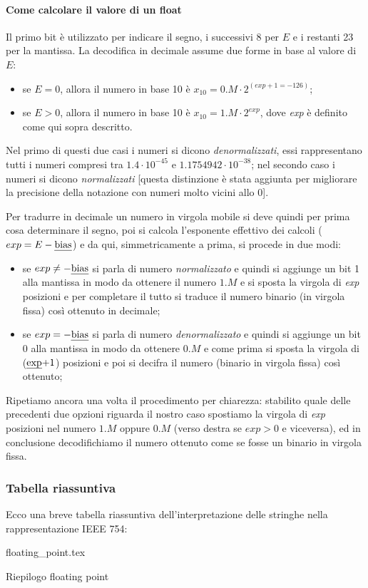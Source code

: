 \documentclass[class=book, crop=false, oneside]{standalone}
\begin{document}
\paragraph{Come calcolare il valore di un float} Il primo bit è utilizzato per indicare il segno, i successivi 8 per \(E\) e i restanti 23 per la mantissa. La decodifica in decimale assume due forme in base al valore di \(E\):
\begin{itemize}
	\item se \(E=0\), allora il numero in base 10 è \(x_{10}=0.M \cdot 2^{(exp+1=-126)}\);
	\item se \(E>0\), allora il numero in base 10 è \(x_{10}=1.M \cdot 2^{exp}\), dove \emph{exp} è definito come qui sopra descritto.
\end{itemize}
Nel primo di questi due casi i numeri si dicono \emph{denormalizzati}, essi rappresentano tutti i numeri compresi tra \(1.4\cdot10^{-45}\) e \(1.1754942\cdot10^{-38}\); nel secondo caso i numeri si dicono \emph{normalizzati} [questa distinzione è stata aggiunta per migliorare la precisione della notazione con numeri molto vicini allo 0].

Per tradurre in decimale un numero in virgola mobile si deve quindi per prima cosa determinare il segno, poi si calcola l'esponente effettivo dei calcoli (\(exp=E-\text{\emph{bias}}\)) e da qui, simmetricamente a prima, si procede in due modi:
\begin{itemize}
	\item se \(exp\neq-\text{\emph{bias}}\) si parla di numero \emph{normalizzato} e quindi si aggiunge un bit 1 alla mantissa in modo da ottenere il numero \(1.M\) e si sposta la virgola di \emph{exp} posizioni e per completare il tutto si traduce il numero binario (in virgola fissa) così ottenuto in decimale;
	\item se \(exp=-\text{\emph{bias}}\) si parla di numero \emph{denormalizzato} e quindi si aggiunge un bit 0 alla mantissa in modo da ottenere $0.M$ e come prima si sposta la virgola di (\(\text{\emph{exp}+1}\)) posizioni e poi si decifra il numero (binario in virgola fissa) così ottenuto;
\end{itemize}
Ripetiamo ancora una volta il procedimento per chiarezza: stabilito quale delle precedenti due opzioni riguarda il nostro caso spostiamo la virgola di \emph{exp} posizioni nel numero \(1.M\) oppure \(0.M\) (verso destra se \(exp>0\) e viceversa), ed in conclusione decodifichiamo il numero ottenuto come se fosse un binario in virgola fissa.

\subsubsection{Tabella riassuntiva}
Ecco una breve tabella riassuntiva dell'interpretazione delle stringhe nella rappresentazione IEEE 754:
\begin{table}[h!]
	\centering
	{floating_point.tex}
	\caption{Riepilogo floating point}
\end{table}
\end{document}

